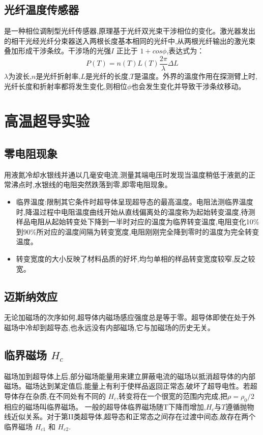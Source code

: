 \documentclass[12pt, a4paper]{article}
\begin{document}
\subsection{光纤温度传感器}
是一种相位调制型光纤传感器,原理基于光纤双光束干涉相位的变化。激光器发出的相干光经光纤分束器送入两根长度基本相同的光纤中,从两根光纤输出的激光束叠加形成干涉条纹。干涉场的光强$I$ 正比于 $1+cos\phi$,表达式为：
\begin{equation}
   P(T)=n(T)L(T)\frac{2\pi}{\lambda}\Delta L
\end{equation}
$\lambda$为波长,$n$是光纤折射率,$L$是光纤的长度,$T$是温度。外界的溫度作用在探测臂上时,光纤长度和折射率都将发生变化,则相位$\phi$也会发生变化并导致干涉条纹移动。
\section{高温超导实验}
\subsection{零电阻现象}
用液氮冷却水银线并通以几毫安电流,测量其端电压时发现当温度稍低于液氦的正常沸点时,水银线的电阻突然跌落到零,即零电阻现象。
\begin{itemize}
    \item 临界温度:限制其它条件时超导体呈现超导态的最高温度。电阻法测临界温度时,降温过程中电阻温度曲线开始从直线偏离处的温度称为起始转变温度,待测样品电阻从起始转变处下降到一半时对应的温度为临界转变温度,电阻变化10\%到90\%所对应的温度间隔为转变宽度,电阻刚刚完全降到零时的温度为完全转变温度。
    \item 转变宽度的大小反映了材料品质的好坏,均匀单相的样品转变宽度较窄,反之较宽。
\end{itemize}
\subsection{迈斯纳效应}
无论加磁场的次序如何,超导体内磁场感应强度总是等于零。超导体即使在处于外磁场中冷却到超导态,也永远没有内部磁场,它与加磁场的历史无关。

\subsection{临界磁场 $H_c$}
磁场加到超导体上后,部分磁场能量用来建立屏蔽电流的磁场以抵消超导体的内部磁场。磁场达到某定值后,能量上有利于使样品返回正常态,破坏了超导电性。若超导体存在杂质,在不同处有不同的 $H_c$,转变将在一个很宽的范围内完成,把$\rho=\rho_0/2$ 相应的磁场叫临界磁场。
一般的超导体临界磁场随T下降而增加,$H_c$与$T$遵循抛物线近似关系。对于第II类超导体,超导态和正常态之间存在过渡中间态,故存在两个临界磁场 $H_{c1}$ 和 $H_{c2}$.
\end{document}
